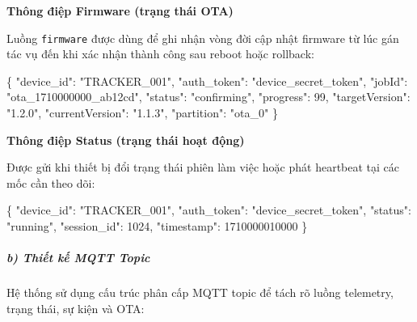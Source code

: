 \documentclass[a4paper]{extarticle}
\newenvironment{Shaded}{}{}
\newcommand{\DataTypeTok}[1]{\textcolor[rgb]{0.56,0.13,0.00}{#1}}
\newcommand{\DecValTok}[1]{\textcolor[rgb]{0.25,0.63,0.44}{#1}}
\newcommand{\FunctionTok}[1]{\textcolor[rgb]{0.02,0.16,0.49}{#1}}
\newcommand{\StringTok}[1]{\textcolor[rgb]{0.25,0.44,0.63}{#1}}
\begin{document}
\textbf{Thông điệp Firmware (trạng thái OTA)}

Luồng \texttt{firmware} được dùng để ghi nhận vòng đời cập nhật firmware
từ lúc gán tác vụ đến khi xác nhận thành công sau reboot hoặc rollback:

\begin{Shaded}
\begin{Highlighting}[]
\FunctionTok{\{}
  \DataTypeTok{"device\_id"}\FunctionTok{:} \StringTok{"TRACKER\_001"}\FunctionTok{,}
  \DataTypeTok{"auth\_token"}\FunctionTok{:} \StringTok{"device\_secret\_token"}\FunctionTok{,}
  \DataTypeTok{"jobId"}\FunctionTok{:} \StringTok{"ota\_1710000000\_ab12cd"}\FunctionTok{,}
  \DataTypeTok{"status"}\FunctionTok{:} \StringTok{"confirming"}\FunctionTok{,}
  \DataTypeTok{"progress"}\FunctionTok{:} \DecValTok{99}\FunctionTok{,}
  \DataTypeTok{"targetVersion"}\FunctionTok{:} \StringTok{"1.2.0"}\FunctionTok{,}
  \DataTypeTok{"currentVersion"}\FunctionTok{:} \StringTok{"1.1.3"}\FunctionTok{,}
  \DataTypeTok{"partition"}\FunctionTok{:} \StringTok{"ota\_0"}
\FunctionTok{\}}
\end{Highlighting}
\end{Shaded}

\textbf{Thông điệp Status (trạng thái hoạt động)}

Được gửi khi thiết bị đổi trạng thái phiên làm việc hoặc phát heartbeat
tại các mốc cần theo dõi:

\begin{Shaded}
\begin{Highlighting}[]
\FunctionTok{\{}
  \DataTypeTok{"device\_id"}\FunctionTok{:} \StringTok{"TRACKER\_001"}\FunctionTok{,}
  \DataTypeTok{"auth\_token"}\FunctionTok{:} \StringTok{"device\_secret\_token"}\FunctionTok{,}
  \DataTypeTok{"status"}\FunctionTok{:} \StringTok{"running"}\FunctionTok{,}
  \DataTypeTok{"session\_id"}\FunctionTok{:} \DecValTok{1024}\FunctionTok{,}
  \DataTypeTok{"timestamp"}\FunctionTok{:} \DecValTok{1710000010000}
\FunctionTok{\}}
\end{Highlighting}
\end{Shaded}

\subparagraph{b) Thiết kế MQTT
Topic}\label{b-thiux1ebft-kux1ebf-mqtt-topic}

Hệ thống sử dụng cấu trúc phân cấp MQTT topic để tách rõ luồng
telemetry, trạng thái, sự kiện và OTA:
\end{document}
